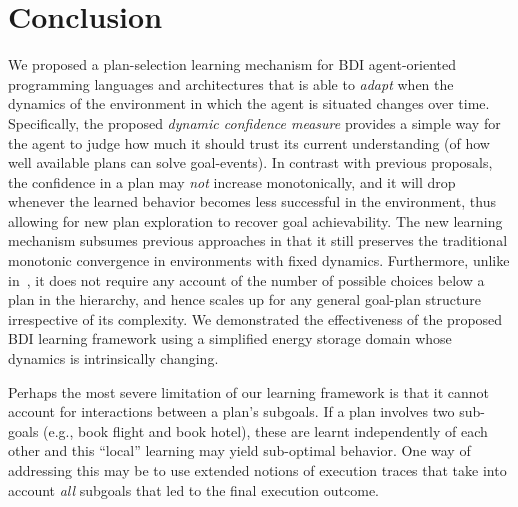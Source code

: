 \section{Conclusion}\label{sec:discussion}

We proposed a plan-selection learning mechanism for BDI agent-oriented programming languages and architectures that is able to \emph{adapt} when the dynamics of the environment in which the agent is situated changes over time.
Specifically, the proposed \emph{dynamic confidence measure} provides a simple way for the agent to judge how much it should trust its current understanding (of how well available plans can solve goal-events). 
In contrast with previous proposals, the confidence in a plan may \emph{not} increase monotonically, and it will drop whenever the learned behavior becomes less successful in the environment, thus allowing for new plan exploration to recover goal achievability. 
%
The new learning mechanism subsumes previous approaches in that it still preserves the traditional monotonic convergence in environments with fixed dynamics.
%
Furthermore, unlike in~\cite{singh10:extending,singh10:learning}, it does not require any account of the number of possible choices below a plan in the hierarchy, and hence scales up for any general goal-plan structure irrespective of its complexity. 
We demonstrated the effectiveness of the proposed BDI learning framework using a simplified energy storage domain whose dynamics is intrinsically changing.

Perhaps the most severe limitation of our learning framework is that it cannot account for interactions between a plan's subgoals. If a plan involves two sub-goals (e.g., book flight and book hotel), these are learnt independently of each other and this ``local'' learning may yield sub-optimal behavior. One way of addressing this may be to use extended notions of execution traces that take into account \emph{all} subgoals that led to the final execution outcome.



